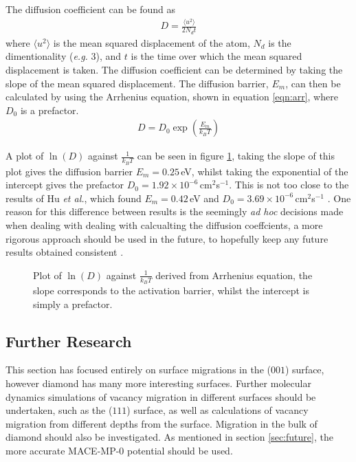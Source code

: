 \documentclass[10pt,a4paper,twocolumn,twoside]{extarticle}
\newcommand{\al}{\emph{et al.}}
\begin{document}
The diffusion coefficient can be found as 
\begin{align}
	D = \frac{\langle u^2 \rangle}{2N_dt}
\end{align}
where $\langle u^2 \rangle$ is the mean squared displacement of the atom, $N_d$ is the dimentionality (\emph{e.g.} 3), and $t$ is the time over which the mean squared displacement is taken. The diffusion coefficient can be determined by taking the slope of the mean squared displacement. The diffusion barrier, $E_m$, can then be calculated by using the Arrhenius equation, shown in equation \ref{eqn:arr}, where $D_0$ is a prefactor. 
\begin{align}
	\label{eqn:arr}
	D = D_0 \exp(\frac{E_m}{k_BT})
\end{align}

A plot of $\ln(D)$ against $\frac{1}{k_BT}$ can be seen in figure \ref{fig:arr}, taking the slope of this plot gives the diffusion barrier $E_m = 0.25$\,eV, whilst taking the exponential of the intercept gives the prefactor $D_0 = 1.92\times10^{-6}$\,cm$^2$s$^{-1}$. This is not too close to the results of Hu \al, which found $E_m = 0.42$\,eV and $D_0 = 3.69\times10^{-6}$\,cm$^2$s$^{-1}$ \cite{hu}. One reason for this difference between results is the seemingly \emph{ad hoc} decisions made when dealing with dealing with calcualting the diffusion coeffcients, a more rigorous approach should be used in the future, to hopefully keep any future results obtained consistent \cite{DiffusionRigorous}. 


\begin{figure}
		\resizebox{\columnwidth}{!}{%
		
		}
		\caption{Plot of $\ln(D)$ against $\frac{1}{k_BT}$ derived from  Arrhenius equation, the slope corresponds  to the activation barrier, whilst the intercept is simply a prefactor.}
		\label{fig:arr}
\end{figure}


\subsection{Further Research}
This section has focused entirely on surface migrations in the ($001$) surface, however diamond has many more interesting surfaces. Further molecular dynamics simulations of vacancy migration in different surfaces should be undertaken, such as the ($111$) surface, as well as calculations of vacancy migration from different depths from the surface. Migration in the bulk of diamond should also be investigated.
As mentioned in section \ref{sec:future}, the more accurate MACE-MP-0 potential \cite{MACE} should be used. 
\end{document}
